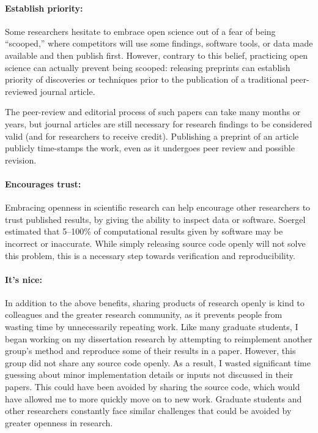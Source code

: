 \documentclass[nobib]{tufte-handout}
\begin{document}
\paragraph{Establish priority:}
Some researchers hesitate to embrace open science out of a fear of being ``scooped,''
where competitors will use some findings, software tools, or data made available
and then publish first. However, contrary to this belief, practicing open science
can actually prevent being scooped: releasing preprints can establish priority of
discoveries or techniques prior to the publication of a traditional peer-reviewed
journal article\autocite{Berg:2016gl,Strasser:2016fr}.

The peer-review and editorial process of such papers can take many months or years,
but journal articles are still necessary for research findings to be considered valid
(and for researchers to receive credit). Publishing a preprint of an article
publicly time-stamps the work, even as it undergoes peer review and possible
revision.

\paragraph{Encourages trust:}
Embracing openness in scientific research can help encourage other researchers
to trust published results, by giving the ability to inspect data or software.
Soergel estimated that 5--100\% of computational results given by software
may be incorrect or inaccurate\autocite{Soergel:2015ef}. While simply releasing
source code openly will not solve this problem, this is a necessary step towards
verification and reproducibility.

\paragraph{It's nice:}
In addition to the above benefits, sharing products of research openly is kind
to colleagues and the greater research community, as it prevents people from
wasting time by unnecessarily repeating work.
Like many graduate students, I began working on my dissertation research by
attempting to reimplement another group's method and reproduce some of their
results in a paper. However, this group did not share any source code openly.
As a result, I wasted significant time guessing about minor implementation details
or inputs not discussed in their papers. This could have been avoided by sharing
the source code, which would have allowed me to more quickly move on to new work.
Graduate students and other researchers constantly face similar challenges that
could be avoided by greater openness in research.
\end{document}
